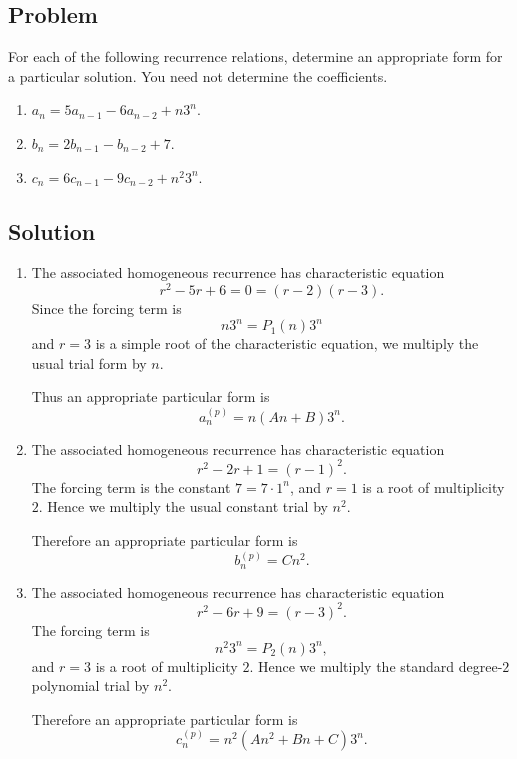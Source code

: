 \documentclass[12pt]{article}
\begin{document}
\subsection{Problem}

For each of the following recurrence relations, determine an appropriate form for a particular solution. You need not determine the coefficients.

\begin{enumerate}[label=(\alph*)]
    \item \(a_n=5a_{n-1}-6a_{n-2}+n3^n\).
    \item \(b_n=2b_{n-1}-b_{n-2}+7\).
    \item \(c_n=6c_{n-1}-9c_{n-2}+n^2 3^n\).
\end{enumerate}

\subsection{Solution}

\begin{enumerate}[label=(\alph*)]
    \item The associated homogeneous recurrence has characteristic equation
    \[
    r^2-5r+6=0=(r-2)(r-3).
    \]
    Since the forcing term is
    \[
    n3^n=P_1(n)3^n
    \]
    and $r=3$ is a simple root of the characteristic equation, we multiply the usual trial form by $n$.

    Thus an appropriate particular form is
    \[
    \boxed{a_n^{(p)}=n(An+B)3^n.}
    \]

    \item The associated homogeneous recurrence has characteristic equation
    \[
    r^2-2r+1=(r-1)^2.
    \]
    The forcing term is the constant $7=7\cdot 1^n$, and $r=1$ is a root of multiplicity $2$. Hence we multiply the usual constant trial by $n^2$.

    Therefore an appropriate particular form is
    \[
    \boxed{b_n^{(p)}=Cn^2.}
    \]

    \item The associated homogeneous recurrence has characteristic equation
    \[
    r^2-6r+9=(r-3)^2.
    \]
    The forcing term is
    \[
    n^2 3^n=P_2(n)3^n,
    \]
    and $r=3$ is a root of multiplicity $2$. Hence we multiply the standard degree-$2$ polynomial trial by $n^2$.

    Therefore an appropriate particular form is
    \[
    \boxed{c_n^{(p)}=n^2(An^2+Bn+C)3^n.}
    \]
\end{enumerate}
\end{document}
